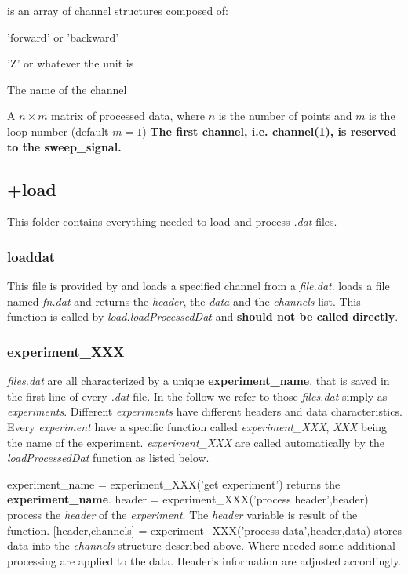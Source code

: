\item[channels] is an array of channel structures composed of:
  \bdf
  \item[Direction] 'forward' or 'backward'
  \item[Unit] 'Z' or whatever the unit is
  \item[Name] The name of the channel
  \item[data] A $n\times m$ matrix of processed data, where $n$ is the number of points and $m$ is the loop number (default $m=1$)
  \edf
\edf
\textbf{The first channel, i.e. channel(1), is reserved to the sweep\_signal.}

\subsection{+load}
This folder contains everything needed to load and process \emph{.dat} files.
\subsubsection{loaddat}
This file is provided by \nanonis{} and loads a specified channel from a \emph{file.dat}.
\bdf
{} loads a file named \emph{fn.dat} and returns the \emph{header}, the \emph{data} and the \emph{channels} list.
 This function is called by \emph{load.loadProcessedDat} and \textbf{should not be called directly}.
\edf
\subsubsection{experiment\_XXX}
\emph{files.dat} are all characterized by a unique \textbf{experiment\_name}, that is saved in the first line of every \emph{.dat} file.
In the follow we refer to those \emph{files.dat} simply as \emph{experiments}.
Different \emph{experiments} have different headers and data characteristics.
Every \emph{experiment} have a specific function called \emph{experiment\_XXX}, \emph{XXX} being the name of the experiment.
\emph{experiment\_XXX} are called automatically by the \emph{loadProcessedDat} function as listed below.

\bdf
\+ {experiment\_name = experiment\_XXX('get experiment')} returns the \textbf{experiment\_name}.
\+ {header = experiment\_XXX('process header',header)} process the \emph{header} of the \emph{experiment}. 
The \emph{header} variable is result of the function.
\+ {[header,channels] = experiment\_XXX('process data',header,data)} stores data into the \emph{channels} structure described above. Where needed some additional processing are applied to the data. Header's information are adjusted accordingly.
\edf

